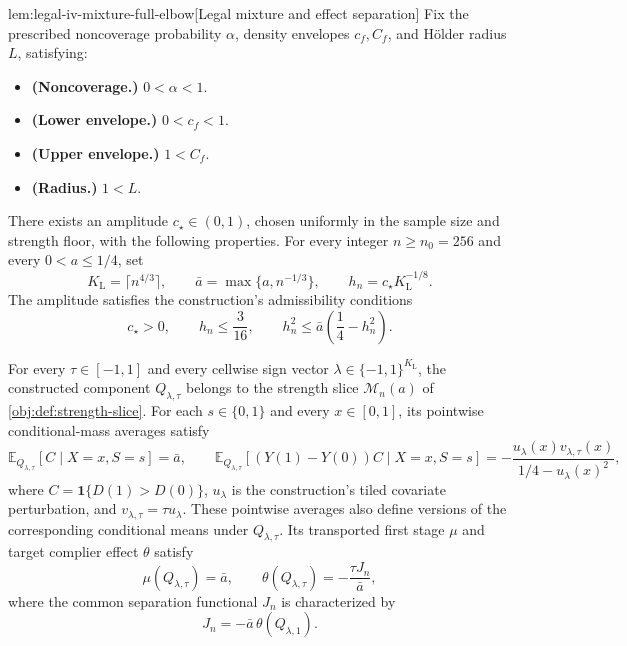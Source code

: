 \begin{lemmav}{lem:legal-iv-mixture-full-elbow}[Legal mixture and effect separation]
Fix the prescribed noncoverage probability \(\alpha\), density envelopes \(c_f,C_f\), and Hölder radius \(L\), satisfying:
\begin{itemize}
\item \textbf{(Noncoverage.)} \(0<\alpha<1\).
\item \textbf{(Lower envelope.)} \(0<c_f<1\).
\item \textbf{(Upper envelope.)} \(1<C_f\).
\item \textbf{(Radius.)} \(1<L\).
\end{itemize}
There exists an amplitude \(c_{\star}\in(0,1)\), chosen uniformly in the sample size and strength floor, with the following properties. For every integer \(n\ge n_0=256\) and every \(0<a\le1/4\), set
\[
K_{\mathrm L}=\lceil n^{4/3}\rceil,
\qquad
\bar a=\max\{a,n^{-1/3}\},
\qquad
h_n=c_{\star}K_{\mathrm L}^{-1/8}.
\]
The amplitude satisfies the construction's admissibility conditions
\[
c_{\star}>0,
\qquad
h_n\le\frac{3}{16},
\qquad
h_n^2\le\bar a\left(\frac14-h_n^2\right).
\]

For every \(\tau\in[-1,1]\) and every cellwise sign vector
\(\lambda\in\{-1,1\}^{K_{\mathrm L}}\), the constructed component
\(Q_{\lambda,\tau}\) belongs to the strength slice
\(\mathcal M_n(a)\) of \cref{obj:def:strength-slice}.
For each \(s\in\{0,1\}\) and every \(x\in[0,1]\), its pointwise conditional-mass averages satisfy
\[
\mathbb E_{Q_{\lambda,\tau}}[C\mid X=x,S=s]=\bar a,
\qquad
\mathbb E_{Q_{\lambda,\tau}}
 [(Y(1)-Y(0))C\mid X=x,S=s]
 =
 -\frac{u_{\lambda}(x)v_{\lambda,\tau}(x)}
 {1/4-u_{\lambda}(x)^2},
\]
where \(C=\mathbf 1\{D(1)>D(0)\}\), \(u_{\lambda}\) is the construction's tiled covariate perturbation, and \(v_{\lambda,\tau}=\tau u_{\lambda}\). These pointwise averages also define versions of the corresponding conditional means under \(Q_{\lambda,\tau}\). Its transported first stage \(\mu\) and target complier effect \(\theta\) satisfy
\[
\mu(Q_{\lambda,\tau})=\bar a,
\qquad
\theta(Q_{\lambda,\tau})=-\frac{\tau J_n}{\bar a},
\]
where the common separation functional \(J_n\) is characterized by
\[
J_n=-\bar a\,\theta(Q_{\lambda,1}).
\]


\end{lemmav}

